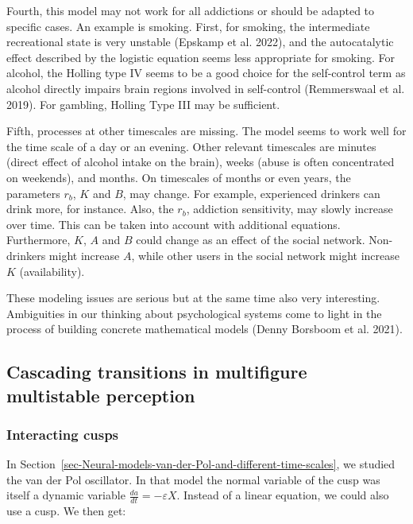 \documentclass[
  a4paper,
  DIV=11,
  numbers=noendperiod,
  oneside]{scrreprt}
\begin{document}
Fourth, this model may not work for all addictions or should be adapted
to specific cases. An example is smoking. First, for smoking, the
intermediate recreational state is very unstable (Epskamp et al. 2022),
and the autocatalytic effect described by the logistic equation seems
less appropriate for smoking. For alcohol, the Holling type IV seems to
be a good choice for the self-control term as alcohol directly impairs
brain regions involved in self-control (Remmerswaal et al. 2019). For
gambling, Holling Type III may be sufficient.

Fifth, processes at other timescales are missing. The model seems to
work well for the time scale of a day or an evening. Other relevant
timescales are minutes (direct effect of alcohol intake on the brain),
weeks (abuse is often concentrated on weekends), and months. On
timescales of months or even years, the parameters \(r_{b}\), \(K\) and
\(B\), may change. For example, experienced drinkers can drink more, for
instance. Also, the \(r_{b}\), addiction sensitivity, may slowly
increase over time. This can be taken into account with additional
equations. Furthermore, \(K\), \(A\) and \(B\) could change as an effect
of the social network. Non-drinkers might increase \(A\), while other
users in the social network might increase \(K\) (availability).

These modeling issues are serious but at the same time also very
interesting. Ambiguities in our thinking about psychological systems
come to light in the process of building concrete mathematical models
(Denny Borsboom et al. 2021).

\hypertarget{sec-Cascading-transitions-in-multifigure-multistable-perception}{%
\subsection{Cascading transitions in multifigure multistable
perception}\label{sec-Cascading-transitions-in-multifigure-multistable-perception}}

\hypertarget{sec-Interacting-cusps}{%
\subsubsection{Interacting cusps}\label{sec-Interacting-cusps}}

In
Section~\ref{sec-Neural-models-van-der-Pol-and-different-time-scales},
we studied the van der Pol oscillator. In that model the normal variable
of the cusp was itself a dynamic variable
\(\frac{da}{dt}= - \varepsilon X\). Instead of a linear equation, we
could also use a cusp. We then get:
\end{document}

